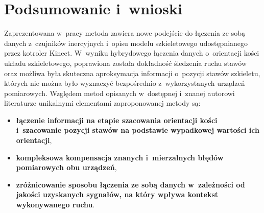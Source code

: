 \chapter{Podsumowanie i~wnioski }\label{chap:finalSummary}

Zaprezentowana w~pracy metoda zawiera nowe podejście do łączenia ze sobą danych z~czujników inercyjnych i~opisu modelu szkieletowego udostępnianego przez kotroler Kinect. W~wyniku hybrydowego łączenia danych o~orientacji kości układu szkieletowego, poprawiona została dokładność śledzenia ruchu stawów oraz możliwa była skuteczna aproksymacja informacji o~pozycji stawów szkieletu, których nie można było wyznaczyć bezpośrednio z~wykorzystanych urządzeń pomiarowych. Względem metod opisanych w~dostępnej i~znanej autorowi literaturze unikalnymi elementami zaproponowanej metody są:
\begin{itemize}
	\item \textbf{łączenie informacji na etapie szacowania orientacji kości i~szacowanie pozycji stawów na podstawie wypadkowej wartości ich orientacji},\\
	\item \textbf{kompleksowa kompensacja znanych i~mierzalnych błędów pomiarowych obu urządzeń}, \\
	\item \textbf{zróżnicowanie sposobu łączenia ze sobą danych w~zależności od jakości uzyskanych sygnałów, na który wpływa kontekst wykonywanego ruchu}.
\end{itemize}


